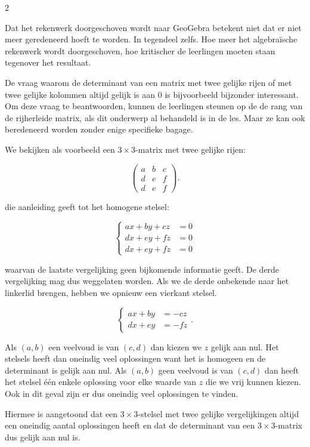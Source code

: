 \begin{multicols}{2}

Dat het rekenwerk doorgeschoven wordt naar GeoGebra betekent niet dat er niet meer geredeneerd hoeft te worden. In tegendeel zelfs. Hoe meer het algebraïsche rekenwerk wordt doorgeschoven, hoe kritischer de leerlingen moeten staan tegenover het resultaat. 

De vraag waarom de determinant van een matrix met twee gelijke rijen of met twee gelijke kolommen altijd gelijk is aan 0 is bijvoorbeeld bijzonder interessant. Om deze vraag te beantwoorden, kunnen de leerlingen steunen op de de rang van de rijherleide matrix, als dit onderwerp al behandeld is in de les. Maar ze kan ook beredeneerd worden zonder enige specifieke bagage.

We bekijken als voorbeeld een $3 \times 3$-matrix met twee gelijke rijen:

\[ \left( \begin{matrix}
    a & b & c \\
    d & e & f \\
    d & e & f
\end{matrix} \right). \]

die aanleiding geeft tot het homogene stelsel:

\[\left\{ 
\begin{aligned} ax+by+cz&=0 \\ dx+ey+fz&=0 \\  dx+ey+fz&=0 \end{aligned}  
\right.\]

waarvan de laatste vergelijking geen bijkomende informatie geeft. De derde vergelijking mag dus weggelaten worden. Als we de derde onbekende naar het linkerlid brengen, hebben we opnieuw een vierkant stelsel.

\[\left\{ 
\begin{aligned} ax+by&=-cz \\ dx+ey&=-fz \end{aligned}  
\right..\]

Als $(a,b)$ een veelvoud is van $(c,d)$ dan kiezen we $z$ gelijk aan nul. Het stelsels heeft dan oneindig veel oplossingen want het is homogeen en de determinant is gelijk aan nul. Als $(a,b)$ geen veelvoud is van $(c,d)$ dan heeft het stelsel één enkele oplossing voor elke waarde van $z$ die we vrij kunnen kiezen. Ook in dit geval zijn er dus oneindig veel oplossingen te vinden. 

Hiermee is aangetoond dat een $3 \times 3$-stelsel met twee gelijke vergelijkingen altijd een oneindig aantal oplossingen heeft en dat de determinant van een $3 \times 3$-matrix dus gelijk aan nul is.


\end{multicols}

